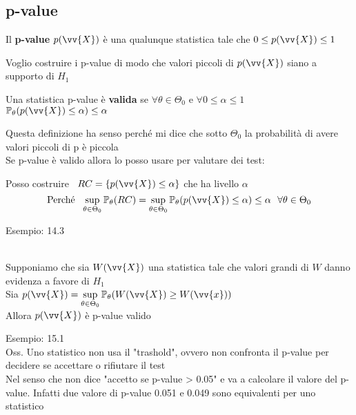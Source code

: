\subsection{p-value}


\begin{defi}
    Il \textbf{p-value} $p(\vv{X})$ è una qualunque statistica tale che $0\le p(\vv{X}) \le 1$
\end{defi}

Voglio costruire i p-value di modo che valori piccoli di $p(\vv{X})$ siano a supporto di $H_1$

\begin{defi}
    Una statistica p-value è \textbf{valida} se $\forall \theta\in \Theta_0$ e $\forall 0 \le \alpha \le 1$ \ \ $\PP_{\theta}(p(\vv{X})\le \alpha)\le \alpha$
\end{defi}

Questa definizione ha senso perché mi dice che sotto $\Theta_0$ la probabilità di avere valori piccoli di p è piccola\\

Se p-value è valido allora lo posso usare per valutare dei test:

Posso costruire \ $RC=\{p(\vv{X})\le \alpha\}$ che ha livello $\alpha$
\[
\text{Perché } \ \sup_{\theta\in \Theta_0} \PP_{\theta} (RC) = \sup_{\theta\in \Theta_0}\PP_{\theta}(p(\vv{X})\le \alpha)\le \alpha \ \ \forall\theta\in \Theta_0
\]
\phantom{}


Esempio: 14.3\\ \\




\begin{teo}
    Supponiamo che sia $W(\vv{X})$ una statistica tale che valori grandi di $W$ danno evidenza a favore di $H_1$\\
    Sia $p(\vv{X}) = \displaystyle \sup_{\theta\in \Theta_0} \PP_{\theta} (W(\vv{X})\ge W(\vv{x}))$ \\
    Allora $p(\vv{X})$ è p-value valido
\end{teo}

Esempio: 15.1\\

Oss. Uno statistico non usa il "trashold", ovvero non confronta il p-value per decidere se accettare o rifiutare il test\\
Nel senso che non dice "accetto se p-value > 0.05" e va a calcolare il valore del p-value. Infatti due valore di p-value 0.051 e 0.049 sono equivalenti per uno statistico\\ \\


